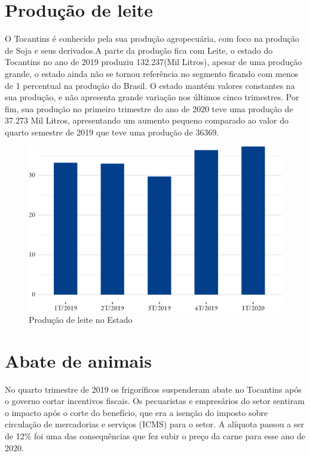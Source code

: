 \section{Produção de leite}
\par O Tocantins é conhecido pela sua produção agropecuária, com foco na produção de Soja e seus derivados.A parte da produção fica com Leite, o estado do Tocantins no ano de 2019 produziu 132.237(Mil Litros), apesar de uma produção grande, o estado ainda não se tornou referência no segmento ficando com menos de 1 percentual na produção do Brasil. O estado mantém valores constantes na sua produção, e não apresenta grande variação nos últimos cinco trimestres. Por fim, sua produção no primeiro trimestre do ano de 2020 teve uma produção de 37.273 Mil Litros, apresentando um aumento pequeno comparado ao valor do quarto semestre de 2019 que teve uma produção de 36369. 

\begin{figure}[h]
	\caption{Produção de leite no Estado}
	\includegraphics{fig/prod_leite-1.pdf}
\end{figure}

\section{Abate de animais}

\par No quarto trimestre de 2019 os frigoríficos suspenderam abate no Tocantins após o governo cortar incentivos fiscais. Os pecuaristas e empresários do setor sentiram o impacto após o corte do benefício, que era a isenção do imposto sobre circulação de mercadorias e serviços (ICMS) para o setor. A alíquota passou a ser de 12\% foi uma das consequências que fez subir o preço da carne para esse ano de 2020.


